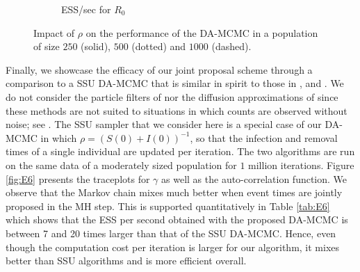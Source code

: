 \documentclass[12pt]{article}
\begin{document}
\begin{figure}
\begin{center}
\begin{subfigure}[b]{0.32\textwidth}
			\caption{ESS/sec for $R_0$
			}
			\label{fig:E3_facet_ESSsecR0}
		\end{subfigure}
	\end{center}
	\caption{Impact of $\rho$ on the performance of the DA-MCMC in a population of size $250$ (solid), $500$ (dotted) and $1000$ (dashed).
		\label{fig:E3}}
\end{figure}

Finally, we showcase the efficacy of our joint proposal scheme through a comparison %
to a SSU DA-MCMC that is similar in spirit to those in \cite{Gibson.1998}, \cite{ONeill.1999} and \cite{Fintzi.2017}. We do not consider the particle filters of \cite{King.2015} nor the diffusion approximations of \cite{Fintzi.2020} since these methods are not suited to situations in which counts are observed without noise; see \cite{Ho.2018}.
The SSU sampler that we consider here is a special case of our DA-MCMC in which $\rho = (S(0)+I(0))^{-1}$, so that the infection and removal times of a single individual are updated per iteration. The two algorithms are run on the same data of a moderately sized population for $1$ million iterations. Figure \ref{fig:E6} presents the traceplots for $\gamma$ as well as the auto-correlation function. We observe that the Markov chain mixes much better when event times are jointly proposed in the MH step. This is supported quantitatively in Table \ref{tab:E6} which shows that the ESS per second obtained with the proposed DA-MCMC is between 7 and 20 times larger than that of the SSU DA-MCMC. Hence, even though the computation cost per iteration is larger for our algorithm, it mixes better than SSU algorithms and is more efficient overall.
\end{document}
